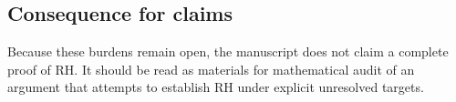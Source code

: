 \subsection*{Consequence for claims}
Because these burdens remain open, the manuscript does not claim a complete proof of RH.
It should be read as materials for mathematical audit of an argument that attempts to establish RH under explicit unresolved targets.

